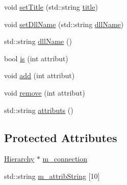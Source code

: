 \begin{DoxyCompactItemize}
\item 
void \hyperlink{classObject_a89557dbbad5bcaa02652f5d7fa35d20f}{set\+Title} (std\+::string \hyperlink{classObject_a73a0f1a41828fdd8303dd662446fb6c3}{title})
\item 
void \hyperlink{classObject_a870c5af919958c2136623b2d7816d123}{set\+Dll\+Name} (std\+::string \hyperlink{classObject_a2e3947f2870094c332d7454117f3ec63}{dll\+Name})
\item 
std\+::string \hyperlink{classObject_a2e3947f2870094c332d7454117f3ec63}{dll\+Name} ()
\item 
bool \hyperlink{classAttrib_a704f26af560909ad22065083bb7d4c34}{is} (int attribut)
\item 
void \hyperlink{classAttrib_a235f773af19c900264a190b00a3b4ad7}{add} (int attribut)
\item 
void \hyperlink{classAttrib_a7d4ef7e32d93cb287792b87b857e79f3}{remove} (int attribut)
\item 
std\+::string \hyperlink{classAttrib_aee7bbf16b144887f196e1341b24f8a26}{attributs} ()
\end{DoxyCompactItemize}
\subsection*{Protected Attributes}
\begin{DoxyCompactItemize}
\item 
\hyperlink{classHierarchy}{Hierarchy} $\ast$ \hyperlink{classElement_abe3de7a5dbbc9a6dd2d7e012e5fdb266}{m\+\_\+connection}
\item 
std\+::string \hyperlink{classAttrib_a3414521d7a82476e874b25a5407b5e63}{m\+\_\+attrib\+String} \mbox{[}10\mbox{]}
\end{DoxyCompactItemize}
